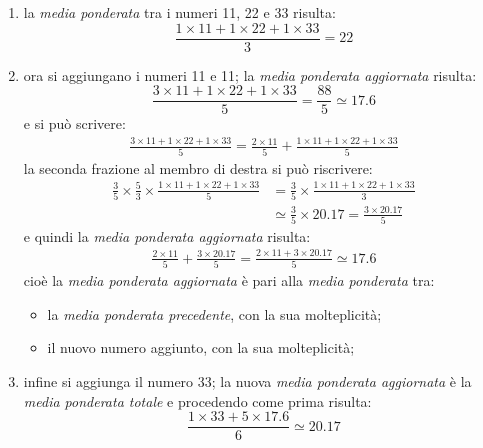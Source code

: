 \documentclass[12pt,a4paper]{article}
\begin{document}
\begin{enumerate}
\item la \emph{media ponderata} tra i numeri \num{11}, \num{22} e \num{33} risulta:
  \begin{equation*}
    \frac{\num{1} \times{} \num{11}
       + \num{1} \times{} \num{22}
       + \num{1} \times{} \num{33}}{\num{3}}
    = \num{22}
  \end{equation*}

\item  ora si  aggiungano  i numeri  \num{11} e  \num{11};  la \emph{media  ponderata
     aggiornata} risulta:
  \begin{equation*}
    \frac{\num{3} \times{} \num{11}
       + \num{1} \times{} \num{22}
       + \num{1} \times{} \num{33}}{\num{5}}
    = \frac{\num{88}}{\num{5}} \simeq \num{17,6}
  \end{equation*}
  e si può scrivere:
  \begin{align*}
    \frac{\num{3} \times{} \num{11}
    + \num{1} \times{} \num{22}
    + \num{1} \times{} \num{33}}{\num{5}}
    = \frac{\num{2} \times{} \num{11}}{\num{5}}
    + \frac{\num{1} \times{} \num{11}
    + \num{1} \times{} \num{22}
    + \num{1} \times{} \num{33}}{\num{5}}
  \end{align*}
  la seconda frazione al membro di destra si può riscrivere:
  \begin{align*}
    \frac{\num{3}}{\num{5}} \times \frac{\num{5}}{\num{3}} \times
    \frac{\num{1} \times{} \num{11}
    + \num{1} \times{} \num{22}
    + \num{1} \times{} \num{33}}{\num{5}}
    &= \frac{\num{3}}{\num{5}} \times
      \frac{\num{1} \times{} \num{11}
      + \num{1} \times{} \num{22}
      + \num{1} \times{} \num{33}}{\num{3}} \\
    &\simeq \frac{\num{3}}{\num{5}} \times{} \num{20,17}
      = \frac{\num{3} \times{} \num{20,17}}{\num{5}}
  \end{align*}
  e quindi la \emph{media ponderata aggiornata} risulta:
  \begin{align*}
    \frac{\num{2} \times{} \num{11}}{\num{5}}
    + \frac{\num{3} \times{} \num{20,17}}{\num{5}}
    = \frac{\num{2} \times{} \num{11} + \num{3} \times{} \num{20,17}}{\num{5}}
    \simeq \num{17,6}
  \end{align*}
  cioè la \emph{media ponderata aggiornata} è pari alla \emph{media ponderata} tra:
  \begin{itemize}
  \item la \emph{media ponderata precedente}, con la sua molteplicità;
  \item il nuovo numero aggiunto, con la sua molteplicità;
  \end{itemize}

\item  infine  si  aggiunga  il  numero  \num{33};  la  nuova  \emph{media  ponderata
     aggiornata} è la \emph{media ponderata totale} e procedendo come prima risulta:
  \begin{equation*}
    \frac{\num{1} \times{} \num{33}
       + \num{5} \times{} \num{17,6}}{\num{6}}
    \simeq \num{20,17}
  \end{equation*}
\end{enumerate}
\end{document}
